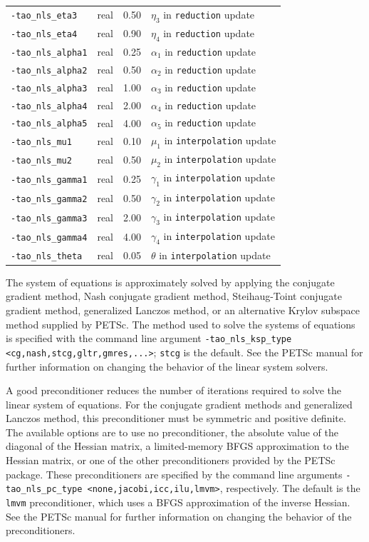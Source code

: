 \documentclass[]{book}
\begin{document}
\begin{table}[h]
\begin{tabular}{l|p{1.5in}|l|p{2.0in}}
{\tt -tao\_nls\_eta3} & real & 0.50 & $\eta_3$ in {\tt reduction} update \\
{\tt -tao\_nls\_eta4} & real & 0.90 & $\eta_4$ in {\tt reduction} update \\
{\tt -tao\_nls\_alpha1} & real & 0.25 & $\alpha_1$ in {\tt reduction} update \\
{\tt -tao\_nls\_alpha2} & real & 0.50 & $\alpha_2$ in {\tt reduction} update \\
{\tt -tao\_nls\_alpha3} & real & 1.00 & $\alpha_3$ in {\tt reduction} update \\
{\tt -tao\_nls\_alpha4} & real & 2.00 & $\alpha_4$ in {\tt reduction} update \\
{\tt -tao\_nls\_alpha5} & real & 4.00 & $\alpha_5$ in {\tt reduction} update \\
{\tt -tao\_nls\_mu1} & real & 0.10 & $\mu_1$ in {\tt interpolation} update \\
{\tt -tao\_nls\_mu2} & real & 0.50 & $\mu_2$ in {\tt interpolation} update \\
{\tt -tao\_nls\_gamma1} & real & 0.25 & $\gamma_1$ in {\tt interpolation} update \\
{\tt -tao\_nls\_gamma2} & real & 0.50 & $\gamma_2$ in {\tt interpolation} update \\
{\tt -tao\_nls\_gamma3} & real & 2.00 & $\gamma_3$ in {\tt interpolation} update \\
{\tt -tao\_nls\_gamma4} & real & 4.00 & $\gamma_4$ in {\tt interpolation} update \\
{\tt -tao\_nls\_theta} & real & 0.05 & $\theta$ in {\tt interpolation} update \\
\hline
\end{tabular}
\end{table}
\afterpage{\clearpage}

The system of equations is approximately solved by applying the conjugate 
gradient method, Nash conjugate gradient method, Steihaug-Toint conjugate 
gradient method, generalized 
Lanczos method, or an alternative Krylov subspace method 
supplied by PETSc.  The method used to solve the systems of equations is 
specified with the command line argument 
{\tt -tao\_nls\_ksp\_type <cg,nash,stcg,gltr,gmres,...>}; {\tt stcg} 
is the default. See the PETSc manual for further information on changing 
the behavior of the linear system solvers.  

A good preconditioner reduces the number of iterations required to
solve the linear system of equations.  For the conjugate gradient
methods and generalized Lanczos method, this preconditioner must be
symmetric and positive definite.  The available options are to use no
preconditioner, the absolute value of the diagonal of the Hessian
matrix, a limited-memory BFGS approximation to the Hessian matrix, or
one of the other preconditioners provided by the PETSc package.  These
preconditioners are specified by the command line arguments 
{\tt -tao\_nls\_pc\_type <none,jacobi,icc,ilu,lmvm>}, respectively. The
default is the {\tt lmvm} preconditioner, which uses a BFGS approximation 
of the inverse Hessian. See the PETSc manual for further information on 
changing the behavior of the preconditioners.
\end{document}
